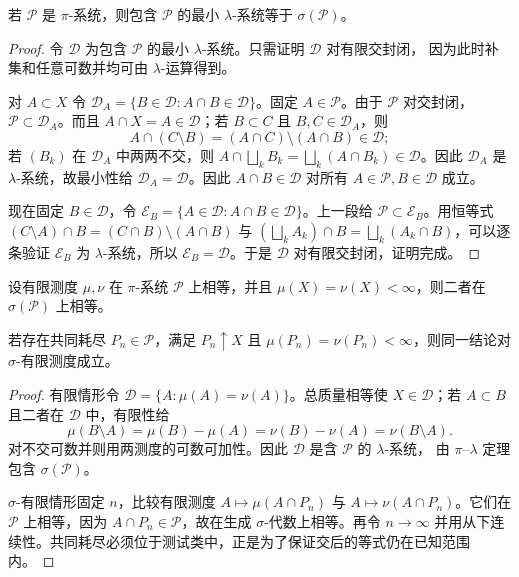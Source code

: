 \begin{theorem}\label{theorem:2-2-1-1}
若 $\mathcal P$ 是 $\pi$-系统，则包含 $\mathcal P$ 的最小 $\lambda$-系统等于
$\sigma(\mathcal P)$。
\end{theorem}

\begin{proof}
令 $\mathcal D$ 为包含 $\mathcal P$ 的最小 $\lambda$-系统。只需证明 $\mathcal D$ 对有限交封闭，
因为此时补集和任意可数并均可由 $\lambda$-运算得到。

对 $A\subset X$ 令
$\mathcal D_A=\{B\in\mathcal D:A\cap B\in\mathcal D\}$。固定
$A\in\mathcal P$。由于 $\mathcal P$ 对交封闭，$\mathcal P\subset\mathcal D_A$。而且
$A\cap X=A\in\mathcal D$；若 $B\subset C$ 且 $B,C\in\mathcal D_A$，则
\[
 A\cap(C\setminus B)=(A\cap C)\setminus(A\cap B)\in\mathcal D;
\]
若 $(B_k)$ 在 $\mathcal D_A$ 中两两不交，则
$A\cap\bigsqcup_kB_k=\bigsqcup_k(A\cap B_k)\in\mathcal D$。因此
$\mathcal D_A$ 是 $\lambda$-系统，故最小性给
$\mathcal D_A=\mathcal D$。因此 $A\cap B\in\mathcal D$ 对所有
$A\in\mathcal P,B\in\mathcal D$ 成立。

现在固定 $B\in\mathcal D$，令
$\mathcal E_B=\{A\in\mathcal D:A\cap B\in\mathcal D\}$。上一段给
$\mathcal P\subset\mathcal E_B$。用恒等式
$(C\setminus A)\cap B=(C\cap B)\setminus(A\cap B)$ 与
$(\bigsqcup_kA_k)\cap B=\bigsqcup_k(A_k\cap B)$，可以逐条验证
$\mathcal E_B$ 为 $\lambda$-系统，所以
$\mathcal E_B=\mathcal D$。于是 $\mathcal D$ 对有限交封闭，证明完成。
\end{proof}

\begin{theorem}[测度唯一性]\label{theorem:2-2-1-2}
设有限测度 $\mu,\nu$ 在 $\pi$-系统 $\mathcal P$ 上相等，并且
$\mu(X)=\nu(X)<\infty$，则二者在 $\sigma(\mathcal P)$ 上相等。

若存在共同耗尽 $P_n\in\mathcal P$，满足 $P_n\uparrow X$ 且
$\mu(P_n)=\nu(P_n)<\infty$，则同一结论对 $\sigma$-有限测度成立。
\end{theorem}

\begin{proof}
有限情形令 $\mathcal D=\{A:\mu(A)=\nu(A)\}$。总质量相等使 $X\in\mathcal D$；若
$A\subset B$ 且二者在 $\mathcal D$ 中，有限性给
\[
 \mu(B\setminus A)=\mu(B)-\mu(A)=\nu(B)-\nu(A)=\nu(B\setminus A).
\]
对不交可数并则用两测度的可数可加性。因此 $\mathcal D$ 是含 $\mathcal P$ 的 $\lambda$-系统，
由 $\pi$--$\lambda$ 定理包含 $\sigma(\mathcal P)$。

$\sigma$-有限情形固定 $n$，比较有限测度
$A\mapsto\mu(A\cap P_n)$ 与 $A\mapsto\nu(A\cap P_n)$。它们在
$\mathcal P$ 上相等，因为 $A\cap P_n\in\mathcal P$，故在生成 $\sigma$-代数上相等。再令
$n\to\infty$ 并用从下连续性。共同耗尽必须位于测试类中，正是为了保证交后的等式仍在已知范围内。
\end{proof}

